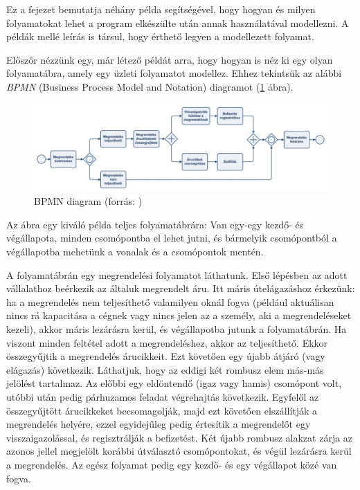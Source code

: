 

Ez a fejezet bemutatja néhány példa segítségével, hogy hogyan és milyen folyamatokat lehet a program elkészülte után annak használatával modellezni. A példák mellé leírás is társul, hogy érthető legyen a modellezett folyamat.


Először nézzünk egy, már létező példát arra, hogy hogyan is néz ki egy olyan folyamatábra, amely egy üzleti folyamatot modellez. Ehhez tekintsük az alábbi \textit{BPMN} (Business Process Model and Notation) diagramot (\ref{fig:bpmn} ábra).

\begin{figure}[h]
\centering
\includegraphics[scale=0.38]{images/BPMN.png}
\caption{BPMN diagram (forrás: \cite{bpmn})}
\label{fig:bpmn}
\end{figure}

Az ábra egy kiváló példa teljes folyamatábrára: Van egy-egy kezdő- és végállapota, minden csomópontba el lehet jutni, és bármelyik csomópontból a végállapotba mehetünk a vonalak és a csomópontok mentén.

A folyamatábrán egy megrendelési folyamatot láthatunk. Első lépésben az adott vállalathoz beérkezik az általuk megrendelt áru. Itt máris útelágazáshoz érkezünk: ha a megrendelés nem teljesíthető valamilyen oknál fogva (például aktuálisan nincs rá kapacitása a cégnek vagy nincs jelen az a személy, aki a megrendeléseket kezeli), akkor máris lezárásra kerül, és végállapotba jutunk a folyamatábrán. Ha viszont minden feltétel adott a megrendeléshez, akkor az teljesíthető. Ekkor összegyűjtik a megrendelés árucikkeit. Ezt követően egy újabb átjáró (vagy elágazás) következik. Láthatjuk, hogy az eddigi két rombusz elem más-más jelölést tartalmaz. Az előbbi egy eldöntendő (igaz vagy hamis) csomópont volt, utóbbi után pedig párhuzamos feladat végrehajtás következik. Egyfelől az összegyűjtött árucikkeket becsomagolják, majd ezt követően elszállítják a megrendelés helyére, ezzel egyidejűleg pedig értesítik a megrendelőt egy visszaigazolással, és regisztrálják a befizetést. Két újabb rombusz alakzat zárja az azonos jellel megjelölt korábbi útválasztó csomópontokat, és végül lezárásra kerül a megrendelés. Az egész folyamat pedig egy kezdő- és egy végállapot közé van fogva.

